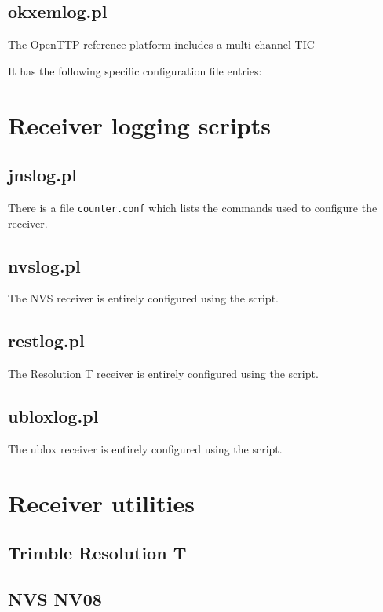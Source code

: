 \documentclass[11pt,a4paper,openany,oneside]{book}
\newcommand{\cc}[1]{{\small\texttt{#1}}}
\begin{document}
\subsection{okxemlog.pl}

The OpenTTP reference platform includes a multi-channel TIC

It has the following specific configuration file entries:

\section{Receiver logging scripts}

\subsection{jnslog.pl}

There is a file \cc{counter.conf} which lists the commands used to configure the receiver.

\subsection{nvslog.pl}

The NVS receiver is entirely configured using the script.

\subsection{restlog.pl}

The Resolution T receiver is entirely configured using the script.

\subsection{ubloxlog.pl}

The ublox receiver is entirely configured using the script.

\section{Receiver utilities}

\subsection{Trimble Resolution T}

\subsection{NVS NV08}
\end{document}
